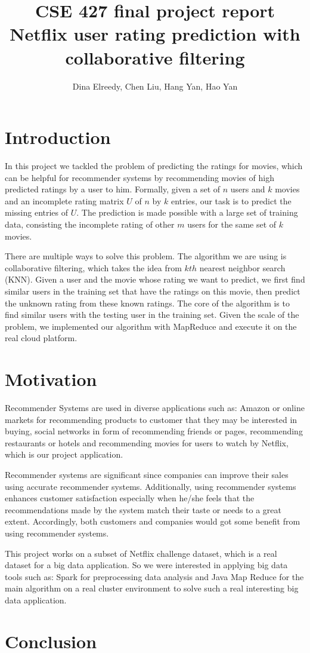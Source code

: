 \documentclass{article}
\title{CSE 427 final project report\\
  Netflix user rating prediction with collaborative filtering}
\author{Dina Elreedy, Chen Liu, Hang Yan, Hao Yan}
\begin{document}
\maketitle
  \section{Introduction}
  In this project we tackled the problem of predicting the ratings for
  movies, which can be helpful for recommender systems by recommending movies of high predicted ratings by a user to him. Formally, given a set of $n$ users and $k$ movies and an
  incomplete rating matrix $U$ of $n$ by $k$ entries, our task is to predict the
  missing entries of $U$. The prediction is made possible with a large
  set of training data, consisting the incomplete rating of other $m$
  users for the same set of $k$ movies.

  There are multiple ways to solve this problem. The algorithm we are
  using is collaborative filtering, which takes the idea from $kth$
  nearest neighbor search (KNN). Given a user and the movie whose
  rating we want to predict, we first find similar users in the
  training set that have the ratings on this movie, then predict the
  unknown rating from these known ratings. The core of the algorithm is
  to find similar users with the testing user in the training
  set. Given the scale of the problem, we implemented our algorithm
  with MapReduce and execute it on the real cloud platform.
\section {Motivation}
Recommender Systems are used in diverse applications such as: Amazon or online markets for recommending products to customer that they may be interested in buying, social networks in form of recommending friends or pages, recommending restaurants or hotels and recommending movies for users to watch by Netflix, which is our project application.

Recommender systems are significant since companies can improve their sales using accurate recommender systems. Additionally, using recommender systems enhances customer satisfaction especially when he/she feels that the recommendations made by the system match their taste or needs to a great extent. Accordingly, both customers and companies would got some benefit from using recommender systems.

This project works on a subset of Netflix challenge dataset, which is a real dataset for a big data application. So we were interested in applying big data tools such as: Spark for preprocessing data analysis and Java Map Reduce for the main algorithm on a real cluster environment to solve such a real interesting big data application. 
  
    
  

  

  

  \section{Conclusion}

  
\end{document}
